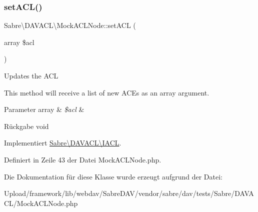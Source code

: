 \subsubsection{\texorpdfstring{set\+A\+C\+L()}{setACL()}}
{\footnotesize\ttfamily Sabre\textbackslash{}\+D\+A\+V\+A\+C\+L\textbackslash{}\+Mock\+A\+C\+L\+Node\+::set\+A\+CL (\begin{DoxyParamCaption}\item[{array}]{\$acl }\end{DoxyParamCaption})}

Updates the A\+CL

This method will receive a list of new A\+CE\textquotesingle{}s as an array argument.


\begin{DoxyParams}[1]{Parameter}
array & {\em \$acl} & \\
\hline
\end{DoxyParams}
\begin{DoxyReturn}{Rückgabe}
void 
\end{DoxyReturn}


Implementiert \mbox{\hyperlink{interface_sabre_1_1_d_a_v_a_c_l_1_1_i_a_c_l_a95e96725db02aae734ce5e7fbb438174}{Sabre\textbackslash{}\+D\+A\+V\+A\+C\+L\textbackslash{}\+I\+A\+CL}}.



Definiert in Zeile 43 der Datei Mock\+A\+C\+L\+Node.\+php.



Die Dokumentation für diese Klasse wurde erzeugt aufgrund der Datei\+:\begin{DoxyCompactItemize}
\item 
Upload/framework/lib/webdav/\+Sabre\+D\+A\+V/vendor/sabre/dav/tests/\+Sabre/\+D\+A\+V\+A\+C\+L/Mock\+A\+C\+L\+Node.\+php\end{DoxyCompactItemize}
